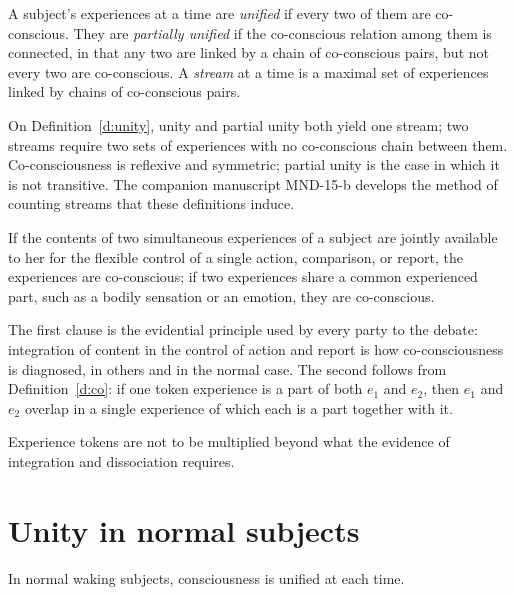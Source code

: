 \documentclass{situationist-preprint}
\begin{document}
\begin{definition}\label{d:unity}
A subject's experiences at a time are \emph{unified} if every two of them are co-conscious. They are \emph{partially unified} if the co-conscious relation among them is connected, in that any two are linked by a chain of co-conscious pairs, but not every two are co-conscious. A \emph{stream} at a time is a maximal set of experiences linked by chains of co-conscious pairs.
\end{definition}

On Definition~\ref{d:unity}, unity and partial unity both yield one stream; two streams require two sets of experiences with no co-conscious chain between them. Co-consciousness is reflexive and symmetric; partial unity is the case in which it is not transitive. The companion manuscript MND-15-b develops the method of counting streams that these definitions induce.

\begin{principle}[Integration]\label{p:int}
If the contents of two simultaneous experiences of a subject are jointly available to her for the flexible control of a single action, comparison, or report, the experiences are co-conscious; if two experiences share a common experienced part, such as a bodily sensation or an emotion, they are co-conscious.
\end{principle}

The first clause is the evidential principle used by every party to the debate: integration of content in the control of action and report is how co-consciousness is diagnosed, in others and in the normal case. The second follows from Definition~\ref{d:co}: if one token experience is a part of both $e_1$ and $e_2$, then $e_1$ and $e_2$ overlap in a single experience of which each is a part together with it.

\begin{principle}\label{p:pars}
Experience tokens are not to be multiplied beyond what the evidence of integration and dissociation requires.
\end{principle}

\section{Unity in normal subjects}

\begin{lemma}\label{l:normal}
In normal waking subjects, consciousness is unified at each time.
\end{lemma}
\end{document}
